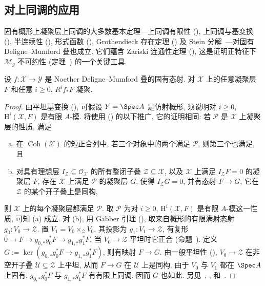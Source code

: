 \subsection{对上同调的应用}\label{src:5.6.3-subsection}
固有概形上凝聚层上同调的大多数基本定理---上同调有限性 (), 上同调与基变换 (), 半连续性 (), 形式函数 (), Grothendieck 存在定理 () 及 Stein 分解~\cite[推论 III.11.5]{Har77}---对固有 Deligne--Mumford 叠也成立. 它们蕴含 Zariski 连通性定理 (), 这是证明正特征下 $\mathcal M_g$ 不可约性 (定理~) 的一个关键工具.
\begin{theorem}[上同调有限性]\label{src:5.6.8}
设 $f:\mathcal X\to\mathcal Y$ 是 Noether Deligne--Mumford 叠的固有态射. 对 $\mathcal X$ 上的任意凝聚层 $F$ 和任意 $i\geq0$, $R^if_*F$ 凝聚.
\end{theorem}
\begin{proof}
由平坦基变换 (), 可假设 $\mathcal Y=\Spec A$ 是仿射概形, 须说明对 $i\geq0$, $\mathrm H^i(\mathcal X,F)$ 是有限 $A$-模. 将使用 () 的以下推广, 它的证明相同: 若 $\mathcal P$ 是 $\mathcal X$ 上凝聚层的性质, 满足
\begin{enumerate}[(a)]
\item 在 $\operatorname{Coh}(\mathcal X)$ 的短正合列中, 若三个对象中的两个满足 $\mathcal P$, 则第三个也满足, 且
\item 对具有理想层 $I_{\mathcal Z}\subseteq\mathcal O_{\mathcal X}$ 的所有整闭子叠 $\mathcal Z\subseteq\mathcal X$, 以及 $\mathcal X$ 上满足 $I_{\mathcal Z}F=0$ 的凝聚层 $F$, 存在 $\mathcal X$ 上满足 $\mathcal P$ 的凝聚层 $G$, 使得 $I_{\mathcal Z}G=0$, 并有态射 $F\to G$, 它在 $\mathcal Z$ 的某个开子叠上是同构,
\end{enumerate}
则 $\mathcal X$ 上的每个凝聚层都满足 $\mathcal P$. 取 $\mathcal P$ 为对 $i\geq0$, $\mathrm H^i(\mathcal X,F)$ 是有限 $A$-模这一性质, 可知 (a) 成立. 对 (b), 用 Gabber 引理 (), 取来自概形的有限满射态射 $g_0:V_0\to\mathcal Z$. 置 $V_1=V_0\times_{\mathcal Z}V_0$, 其投影为 $g_1:V_1\to\mathcal Z$, 有复形 $0\to F\to g_{0,*}g_0^*F\to g_{1,*}g_1^*F$, 当 $V_0\to\mathcal Z$ 平坦时它正合 (命题~). 定义 $G:=\ker(g_{0,*}g_0^*F\to g_{1,*}g_1^*F)$, 则有映射 $F\to G$. 由一般平坦性 (), $V_0\to\mathcal Z$ 在非空开子叠 $\mathcal U\subseteq\mathcal Z$ 上平坦, 从而 $F\to G$ 在 $\mathcal U$ 上是同构. 由于 $V_0$ 与 $V_1$ 都在 $\Spec A$ 上固有, $g_{0,*}g_0^*F$ 与 $g_{1,*}g_1^*F$ 有有限上同调, 因而 $G$ 也如此. 另见~\cite[定理 $1$]{Fal03}, \cite[定理 $1.2$]{Ols05}, \cite[定理 $15.6$]{LMB00} 和~\cite[定理 $11.6.1$]{Ols16}.
\end{proof}
